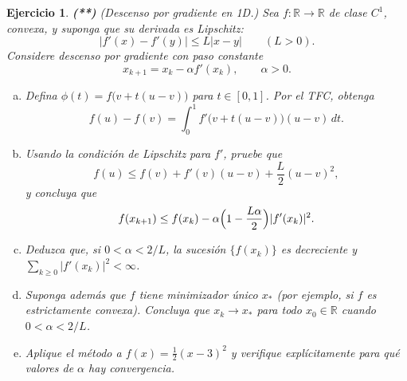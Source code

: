 \documentclass[12pt]{article}
\newtheorem{exercise}{Ejercicio}
\newcommand{\bej}{\begin{exercise}\rm}
\newcommand{\fej}{\end{exercise}}
\newcommand{\R}{\mathbb{R}}
\begin{document}
\bej\textbf{(**)} (Descenso por gradiente en 1D.)
Sea $f:\R\to\R$ de clase $C^1$, convexa, y suponga que su derivada es Lipschitz:
\[
|f'(x)-f'(y)|\le L|x-y|\qquad (L>0).
\]
Considere descenso por gradiente con paso constante
\[
x_{k+1}=x_k-\alpha f'(x_k),\qquad \alpha>0.
\]
\begin{enumerate}[(a)]
	\item Defina $\phi(t)=f\bigl(v+t(u-v)\bigr)$ para $t\in[0,1]$. Por el TFC, obtenga
	\[
	f(u) - f(v) = \int_0^1 f'\bigl(v+t(u-v)\bigr)(u-v)\,dt.
	\]
	\item Usando la condición de Lipschitz para $f'$, pruebe que
	\[
	f(u)\le f(v)+f'(v)(u-v)+\frac{L}{2}(u-v)^2,
	\]
	y concluya que
	\[
	f(x_{k+1})\le f(x_k)-\alpha\Bigl(1-\frac{L\alpha}{2}\Bigr)|f'(x_k)|^2.
	\]

	\item Deduzca que, si $0<\alpha<2/L$, la sucesión $\{f(x_k)\}$ es decreciente y
	$\sum_{k\ge0}|f'(x_k)|^2<\infty$.

	\item Suponga además que $f$ tiene minimizador único $x_\ast$ (por ejemplo, si $f$ es estrictamente convexa).
	Concluya que $x_k\to x_\ast$ para todo $x_0\in\R$ cuando $0<\alpha<2/L$.

	\item Aplique el método a $f(x)=\frac12(x-3)^2$ y verifique explícitamente para qué valores de
	$\alpha$ hay convergencia.
\end{enumerate}
\fej
\end{document}

